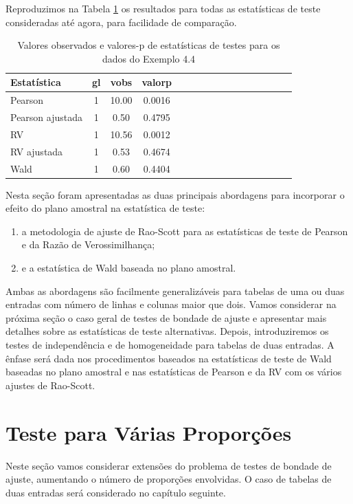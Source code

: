 \documentclass[]{book}
\theoremstyle{definition}
\theoremstyle{definition}
\theoremstyle{definition}
\theoremstyle{remark}
\begin{document}
Reproduzimos na Tabela \ref{tab:testprop} os resultados para todas as
estatísticas de teste consideradas até agora, para facilidade de
comparação.

\begin{table}

\caption{\label{tab:testprop}Valores observados e valores-p de estatísticas de testes para os dados do Exemplo 4.4}
\centering
\begin{tabular}[t]{lccclccclccclccc}
\toprule
Estatística & gl & vobs & valorp\\
\midrule
Pearson & 1 & 10.00 & 0.0016\\
Pearson ajustada & 1 & 0.50 & 0.4795\\
RV & 1 & 10.56 & 0.0012\\
RV ajustada & 1 & 0.53 & 0.4674\\
Wald & 1 & 0.60 & 0.4404\\
\bottomrule
\end{tabular}
\end{table}

Nesta seção foram apresentadas as duas principais abordagens para
incorporar o efeito do plano amostral na estatística de teste:

\begin{enumerate}
\def\labelenumi{\arabic{enumi}.}
\item
  a metodologia de ajuste de Rao-Scott para as estatísticas de teste de
  Pearson e da Razão de Verossimilhança;
\item
  e a estatística de Wald baseada no plano amostral.
\end{enumerate}

Ambas as abordagens são facilmente generalizáveis para tabelas de uma ou
duas entradas com número de linhas e colunas maior que dois. Vamos
considerar na próxima seção o caso geral de testes de bondade de ajuste
e apresentar mais detalhes sobre as estatísticas de teste alternativas.
Depois, introduziremos os testes de independência e de homogeneidade
para tabelas de duas entradas. A ênfase será dada nos procedimentos
baseados na estatísticas de teste de Wald baseadas no plano amostral e
nas estatísticas de Pearson e da RV com os vários ajustes de Rao-Scott.

\section{Teste para Várias
Proporções}\label{teste-para-varias-proporcoes}

Neste seção vamos considerar extensões do problema de testes de bondade
de ajuste, aumentando o número de proporções envolvidas. O caso de
tabelas de duas entradas será considerado no capítulo seguinte.
\end{document}
